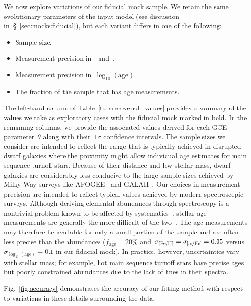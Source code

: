 \documentclass[ms.tex]{subfiles}
\begin{document}
We now explore variations of our fiducial mock sample.
We retain the same evolutionary parameters of the input model (see discussion
in~\S~\ref{sec:mocks:fiducial}), but each variant differs in one of the
following:
\begin{itemize}

	\item Sample size.

	\item Measurement precision in~\feh~and~\afe.

	\item Measurement precision in~$\log_{10}(\text{age})$.

	\item The fraction of the sample that has age measurements.

\end{itemize}
The left-hand column of Table~\ref{tab:recovered_values} provides a summary of
the values we take as exploratory cases with the fiducial mock marked in bold.
In the remaining columns, we provide the associated values derived for each
GCE parameter~$\theta$ along with their~$1\sigma$ confidence intervals.
The sample sizes we consider are intended to reflect the range that is
typically achieved in disrupted dwarf galaxies where the proximity might
allow individual age estimates for main sequence turnoff stars.
Because of their distance and low stellar mass, dwarf galaxies are considerably
less conducive to the large sample sizes achieved by Milky Way surveys like
APOGEE~\citep{Majewski2017} and GALAH~\citep{DeSilva2015, Martell2017}.
Our choices in measurement precision are intended to reflect typical values
achieved by modern spectroscopic surveys.
Although deriving elemental abundances through spectroscopy is a nontrivial
problem known to be affected by systematics~\citep[e.g.,][]{Anguino2018},
stellar age measurements
are generally the more difficult of the two~\citep{Soderblom2010, Chaplin2013}.
The age measurements may therefore be available for only a small portion of the
sample and are often less precise than the abundances ($f_\text{age} = 20$\%
and~$\sigma_{\text{[Fe/H]}} = \sigma_{\text{[$\alpha$/Fe]}} = 0.05$ versus
$\sigma_{\log_{10}(\text{age})} = 0.1$ in our fiducial mock).
In practice, however, uncertainties vary with stellar mass; for example, hot
main sequence turnoff stars have precise ages but poorly constrained
abundances due to the lack of lines in their spectra.
\par
Fig.~\ref{fig:accuracy} demonstrates the accuracy of our fitting method with
respect to variations in these details surrounding the data.
\end{document}
